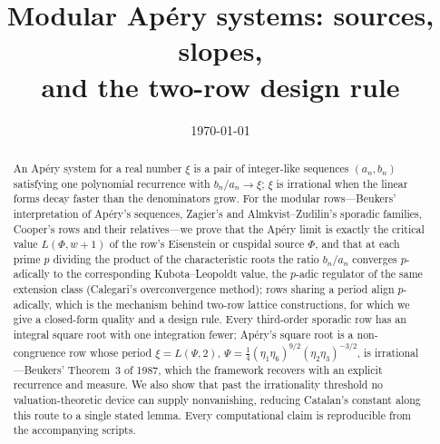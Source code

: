 \documentclass[11pt,reqno]{amsart}
\theoremstyle{plain}
\theoremstyle{definition}
\theoremstyle{remark}
\theoremstyle{plain}
\begin{document}
\title{Modular Ap\'ery systems: sources, slopes,\\ and the two-row design rule}
\author{}
\date{\today}

\maketitle
\begin{abstract}
An Ap\'ery system for a real number $\xi$ is a pair of integer-like sequences $(a_n,b_n)$ satisfying one polynomial recurrence with $b_n/a_n\to\xi$; $\xi$ is irrational when the linear forms decay faster than the denominators grow. For the modular rows---Beukers' interpretation of Ap\'ery's sequences, Zagier's and Almkvist--Zudilin's sporadic families, Cooper's rows and their relatives---we prove that the Ap\'ery limit is exactly the critical value $L(\Phi,w+1)$ of the row's Eisenstein or cuspidal source $\Phi$, and that at each prime $p$ dividing the product of the characteristic roots the ratio $b_n/a_n$ converges $p$-adically to the corresponding Kubota--Leopoldt value, the $p$-adic regulator of the same extension class (Calegari's overconvergence method); rows sharing a period align $p$-adically, which is the mechanism behind two-row lattice constructions, for which we give a closed-form quality and a design rule. Every third-order sporadic row has an integral square root with one integration fewer; Ap\'ery's square root is a non-congruence row whose period $\xi=L(\Psi,2)$, $\Psi=\tfrac14(\eta_1\eta_6)^{9/2}(\eta_2\eta_3)^{-3/2}$, is irrational---Beukers' Theorem~3 of 1987, which the framework recovers with an explicit recurrence and measure. We also show that past the irrationality threshold no valuation-theoretic device can supply nonvanishing, reducing Catalan's constant along this route to a single stated lemma. Every computational claim is reproducible from the accompanying scripts.
\end{abstract}


















\end{document}
